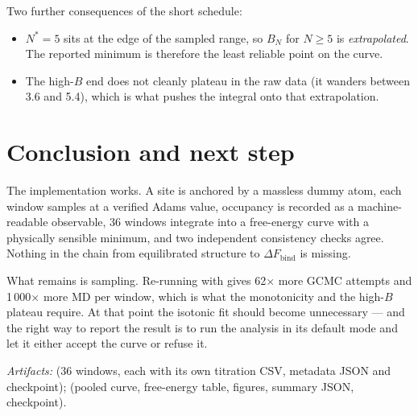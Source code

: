 \documentclass[11pt]{article}
\newcommand{\file}[1]{\texttt{\detokenize{#1}}}
\newcommand{\code}[1]{\texttt{\detokenize{#1}}}
\begin{document}
Two further consequences of the short schedule:

\begin{itemize}[nosep,leftmargin=1.4em]
\item $N^{*} = 5$ sits at the edge of the sampled range, so $B_{N}$ for $N \ge 5$ is
\emph{extrapolated}. The reported minimum is therefore the least reliable point on the curve.
\item The high-$B$ end does not cleanly plateau in the raw data (it wanders between 3.6 and
5.4), which is what pushes the integral onto that extrapolation.
\end{itemize}

\section{Conclusion and next step}

The implementation works. A site is anchored by a massless dummy atom, each window samples at
a verified Adams value, occupancy is recorded as a machine-readable observable, 36 windows
integrate into a free-energy curve with a physically sensible minimum, and two independent
consistency checks agree. Nothing in the chain from equilibrated structure to
$\Delta F_{\text{bind}}$ is missing.

What remains is sampling. Re-running with \code{SMOKE=0} gives 62$\times$ more GCMC attempts
and 1\,000$\times$ more MD per window, which is what the monotonicity and the high-$B$
plateau require. At that point the isotonic fit should become unnecessary --- and the right
way to report the result is to run the analysis in its default mode and let it either accept
the curve or refuse it.

\vspace{0.5em}
\noindent\small\textit{Artifacts:} \file{gci_runs/} (36 windows, each with its own titration
CSV, metadata JSON and checkpoint); \file{figures/} (pooled curve, free-energy table,
figures, summary JSON, checkpoint).
\end{document}
